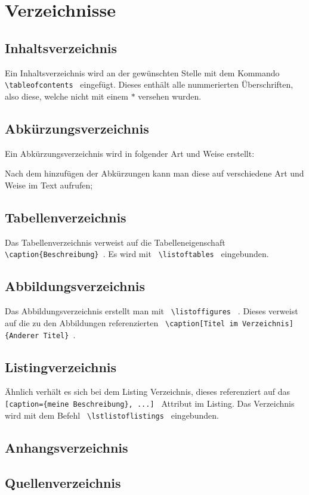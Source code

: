 \section{Verzeichnisse}
\subsection{Inhaltsverzeichnis}
Ein Inhaltsverzeichnis wird an der gewünschten Stelle mit dem Kommando 
\lstinline$ \tableofcontents $ eingefügt. Dieses enthält alle nummerierten 
Überschriften, also diese, welche nicht mit einem $*$ versehen wurden.
\subsection{Abkürzungsverzeichnis}
Ein Abkürzungsverzeichnis wird in folgender Art und Weise erstellt:


Nach dem hinzufügen der Abkürzungen kann man diese auf verschiedene Art und 
Weise im Text aufrufen;

\subsection{Tabellenverzeichnis}
Das Tabellenverzeichnis verweist auf die Tabelleneigenschaft 
\lstinline$ \caption{Beschreibung} $. Es wird mit 
\lstinline $ \listoftables $ eingebunden.

\subsection{Abbildungsverzeichnis}
Das Abbildungsverzeichnis erstellt man mit \lstinline$ \listoffigures $ . 
Dieses verweist auf die zu den Abbildungen referenzierten 
\lstinline $ \caption[Titel im Verzeichnis]{Anderer Titel} $.
\subsection{Listingverzeichnis}
Ähnlich verhält es sich bei dem Listing Verzeichnis, dieses referenziert auf 
das \lstinline $ [caption={meine Beschreibung}, ...] $ Attribut im Listing.
Das Verzeichnis wird mit dem Befehl \lstinline $ \lstlistoflistings $ 
eingebunden.
\subsection{Anhangsverzeichnis}
\subsection{Quellenverzeichnis}